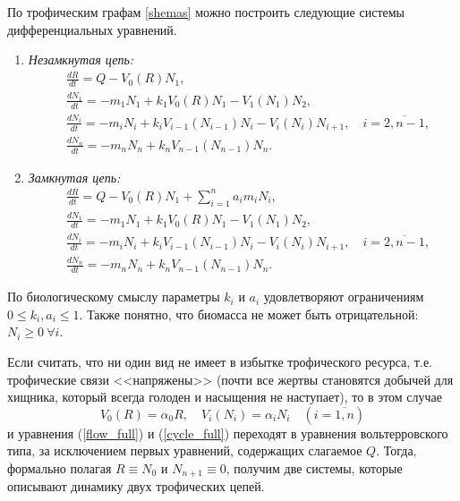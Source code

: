 По трофическим графам \ref{shemas} можно построить следующие системы дифференциальных уравнений. 

\begin{enumerate}[label={\asbuk*)}, ref=\asbuk*]
    \item \textit{Незамкнутая цепь:}
    \begin{equation}  \label{flow_full}
        \begin{split}
            & \frac{dR}{dt} = Q - V_0(R) N_1, \\
            & \frac{dN_1}{dt} = -m_1 N_1 + k_1 V_0(R) N_1 - V_1(N_1) N_2, \\
            & \frac{dN_i}{dt} = -m_i N_i + k_i V_{i-1}(N_{i-1}) N_i - V_i(N_i) N_{i+1}, \quad i=\overline{2,n-1}, \\
            & \frac{dN_n}{dt} = -m_n N_n + k_n V_{n-1}(N_{n-1}) N_n.
        \end{split}
    \end{equation}

    \item \textit{Замкнутая цепь:}
    \begin{equation} \label{cycle_full}
        \begin{split}
            & \frac{dR}{dt} = Q - V_0(R) N_1  + \sum_{i=1}^{n} a_i m_i N_i, \\
            & \frac{dN_1}{dt} = -m_1 N_1 + k_1 V_0(R) N_1 - V_1(N_1) N_2, \\
            & \frac{dN_i}{dt} = -m_i N_i + k_i V_{i-1}(N_{i-1}) N_i - V_i(N_i) N_{i+1}, \quad i=\overline{2,n-1}, \\
            & \frac{dN_n}{dt} = -m_n N_n + k_n V_{n-1}(N_{n-1}) N_n.
        \end{split}
    \end{equation}
\end{enumerate}

По биологическому смыслу параметры $k_i$ и $a_i$ удовлетворяют ограничениям $ 0 \leq k_i, a_i \leq 1 $. Также понятно, что биомасса не может быть отрицательной: \(N_i \geq 0 ~ \forall i\).

Если считать, что ни один вид не имеет в избытке трофического ресурса, т.е. трофические связи <<напряжены>> (почти все жертвы становятся добычей для хищника, который всегда голоден и насыщения не наступает), то в этом случае
\begin{equation}
    V_0(R) = \alpha_0 R, \quad V_i(N_i) = \alpha_i N_i \quad (i=\overline{1,n})
\end{equation}
и уравнения (\ref{flow_full}) и (\ref{cycle_full}) переходят в уравнения вольтерровского типа, за исключением первых уравнений, содержащих слагаемое \(Q\). Тогда, формально полагая \(R \equiv N_0\) и \( N_{n+1} \equiv 0 \), получим две системы, которые описывают динамику двух трофических цепей.  

